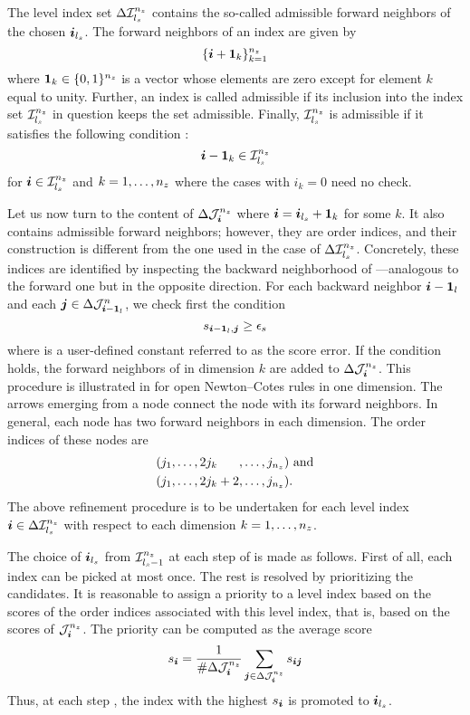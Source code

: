 The level index set $\Delta\mathcal{I}^{{n_{z}}}_{{l_{s}}}$ contains the so-called
admissible forward neighbors of the chosen $\boldsymbol{i}_{{l_{s}}}$. The forward neighbors of
an index \vi are given by
\[
  \{ \boldsymbol{i} + \boldsymbol{1}_k \}_{k = 1}^{n_{z}}
\]
where $\boldsymbol{1}_k \in \{ 0, 1 \}^{n_{z}}$ is a vector whose elements are zero except
for element $k$ equal to unity. Further, an index \vi is called admissible if
its inclusion into the index set $\mathcal{I}^{{n_{z}}}_{{l_{s}}}$ in question keeps the
set admissible. Finally, $\mathcal{I}^{{n_{z}}}_{{l_{s}}}$ is admissible if it satisfies
the following condition \cite{klimke2006}:
\[
  \boldsymbol{i} - \boldsymbol{1}_k \in \mathcal{I}^{{n_{z}}}_{{l_{s}}}
\]
for $\boldsymbol{i} \in \mathcal{I}^{{n_{z}}}_{{l_{s}}}$ and $k = 1, \dots, {n_{z}}$ where the cases
with $i_k = 0$ need no check.

Let us now turn to the content of $\Delta\mathcal{J}^{{n_{z}}}_{\boldsymbol{i}}$ where $\boldsymbol{i} =
\boldsymbol{i}_{{l_{s}}} + \boldsymbol{1}_k$ for some $k$. It also contains admissible forward
neighbors; however, they are order indices, and their construction is different
from the one used in the case of $\Delta\mathcal{I}^{{n_{z}}}_{{l_{s}}}$. Concretely,
these indices are identified by inspecting the backward neighborhood of
\vi---analogous to the forward one but in the opposite direction. For each
backward neighbor $\boldsymbol{i} - \boldsymbol{1}_l$ and each $\boldsymbol{j} \in \Delta\mathcal{J}^{n}_{\boldsymbol{i} -
\boldsymbol{1}_l}$, we check first the condition
\[
  s_{\boldsymbol{i} - \boldsymbol{1}_l, \boldsymbol{j}} \geq \epsilon_{s}
\]
where  is a user-defined constant referred to as the score error. If
the condition holds, the forward neighbors of \vj in dimension $k$ are added to
$\Delta\mathcal{J}^{{n_{z}}}_{\boldsymbol{i}}$. This procedure is illustrated in
 for open Newton--Cotes rules in one dimension. The
arrows emerging from a node connect the node with its forward neighbors. In
general, each node has two forward neighbors in each dimension. The order
indices of these nodes are
\begin{align*}
  & (j_1, \dots, 2 j_k \phantom{{} + 2}, \dots, j_{\nz}) \text{ and} \\
  & (j_1, \dots, 2 j_k + 2,              \dots, j_{\nz}).
\end{align*}
The above refinement procedure is to be undertaken for each level index $\boldsymbol{i} \in
\Delta\mathcal{I}^{{n_{z}}}_{{l_{s}}}$ with respect to each dimension $k =
1, \dots, {n_{z}}$.

The choice of $\boldsymbol{i}_{{l_{s}}}$ from $\mathcal{I}^{{n_{z}}}_{{l_{s}} - 1}$ at each step \ls of
 is made as follows. First of all, each index can be
picked at most once. The rest is resolved by prioritizing the candidates. It is
reasonable to assign a priority to a level index \vi based on the scores of the
order indices associated with this level index, that is, based on the scores of
$\mathcal{J}^{{n_{z}}}_{\boldsymbol{i}}$. The priority can be computed as the average score
\[
  s_{\boldsymbol{i}} = \frac{1}{\# \Delta\mathcal{J}^{{n_{z}}}_{\boldsymbol{i}}} \sum_{\boldsymbol{j} \in \Delta\mathcal{J}^{{n_{z}}}_{\boldsymbol{i}}} s_{\boldsymbol{i} \boldsymbol{j}}
\]
Thus, at each step \ls, the index \vi with the highest $s_{\boldsymbol{i}}$ is promoted to
$\boldsymbol{i}_{{l_{s}}}$.

